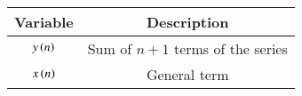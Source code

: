 \begin{tabular}[12pt]{ |c| c|}
    \hline
    \textbf{Variable} & \textbf{Description}\\ 
    \hline
    $y\left(n\right)$ & Sum of $n+1$ terms of the series\\
    \hline
    $x\left(n\right)$ & General term\\
    \hline   
    \end{tabular}